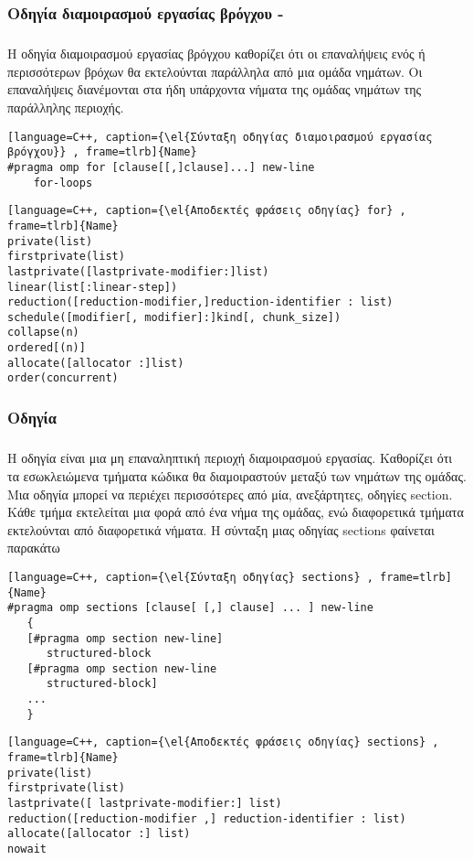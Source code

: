 \subsubsection{Οδηγία διαμοιρασμού εργασίας βρόγχου - }
\subparagraph{}
Η οδηγία διαμοιρασμού εργασίας βρόγχου καθορίζει ότι οι επαναλήψεις ενός ή περισσότερων βρόχων θα εκτελούνται παράλληλα από μια ομάδα νημάτων. Οι επαναλήψεις διανέμονται στα ήδη υπάρχοντα νήματα της ομάδας νημάτων της παράλληλης περιοχής.
\ \\
\begin{lstlisting}[language=C++, caption={\el{Σύνταξη οδηγίας διαμοιρασμού εργασίας βρόγχου}} , frame=tlrb]{Name}
#pragma omp for [clause[[,]clause]...] new-line
	for-loops
\end{lstlisting}
\clearpage
\begin{lstlisting}[language=C++, caption={\el{Αποδεκτές φράσεις οδηγίας} for} , frame=tlrb]{Name}
private(list)
firstprivate(list)
lastprivate([lastprivate-modifier:]list)
linear(list[:linear-step])
reduction([reduction-modifier,]reduction-identifier : list)
schedule([modifier[, modifier]:]kind[, chunk_size])
collapse(n)
ordered[(n)]
allocate([allocator :]list)
order(concurrent)
\end{lstlisting}


\subsubsection{Οδηγία }
\subparagraph{}

      Η οδηγία  είναι μια μη επαναληπτική περιοχή διαμοιρασμού εργασίας. Καθορίζει ότι τα εσωκλειώμενα τμήματα κώδικα θα διαμοιραστούν μεταξύ των νημάτων της ομάδας. Μια οδηγία  μπορεί να περιέχει περισσότερες από μία, ανεξάρτητες, οδηγίες section. Κάθε τμήμα εκτελείται μια φορά από ένα νήμα της ομάδας, ενώ διαφορετικά τμήματα εκτελούνται από διαφορετικά νήματα. Η σύνταξη μιας οδηγίας sections φαίνεται παρακάτω\cite{pdplab}

\begin{lstlisting}[language=C++, caption={\el{Σύνταξη οδηγίας} sections} , frame=tlrb]{Name}
#pragma omp sections [clause[ [,] clause] ... ] new-line 
   { 
   [#pragma omp section new-line] 
      structured-block 
   [#pragma omp section new-line 
      structured-block] 
   ... 
   }
\end{lstlisting}

\begin{lstlisting}[language=C++, caption={\el{Αποδεκτές φράσεις οδηγίας} sections} , frame=tlrb]{Name}
private(list) 
firstprivate(list) 
lastprivate([ lastprivate-modifier:] list) 
reduction([reduction-modifier ,] reduction-identifier : list) 
allocate([allocator :] list) 
nowait
\end{lstlisting}


